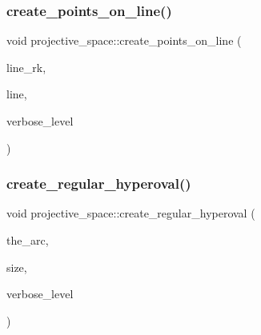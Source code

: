 \subsubsection{\texorpdfstring{create\+\_\+points\+\_\+on\+\_\+line()}{create\_points\_on\_line()}}
{\footnotesize\ttfamily void projective\+\_\+space\+::create\+\_\+points\+\_\+on\+\_\+line (\begin{DoxyParamCaption}\item[{\mbox{\hyperlink{galois_8h_a09fddde158a3a20bd2dcadb609de11dc}{I\+NT}}}]{line\+\_\+rk,  }\item[{\mbox{\hyperlink{galois_8h_a09fddde158a3a20bd2dcadb609de11dc}{I\+NT}} $\ast$}]{line,  }\item[{\mbox{\hyperlink{galois_8h_a09fddde158a3a20bd2dcadb609de11dc}{I\+NT}}}]{verbose\+\_\+level }\end{DoxyParamCaption})}

\mbox{\label{classprojective__space_a5c2f001253952e715762f4e860e6286a}} 
\subsubsection{\texorpdfstring{create\+\_\+regular\+\_\+hyperoval()}{create\_regular\_hyperoval()}}
{\footnotesize\ttfamily void projective\+\_\+space\+::create\+\_\+regular\+\_\+hyperoval (\begin{DoxyParamCaption}\item[{\mbox{\hyperlink{galois_8h_a09fddde158a3a20bd2dcadb609de11dc}{I\+NT}} $\ast$}]{the\+\_\+arc,  }\item[{\mbox{\hyperlink{galois_8h_a09fddde158a3a20bd2dcadb609de11dc}{I\+NT}} \&}]{size,  }\item[{\mbox{\hyperlink{galois_8h_a09fddde158a3a20bd2dcadb609de11dc}{I\+NT}}}]{verbose\+\_\+level }\end{DoxyParamCaption})}

\mbox{\label{classprojective__space_a20718b70827d7208f5e4a4c6a07b426a}} 
